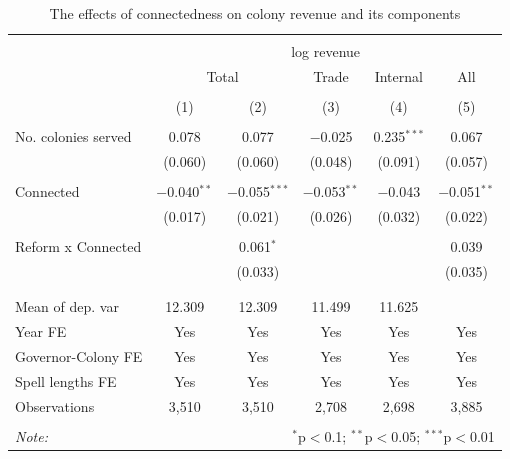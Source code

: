 \documentclass[a4paper]{article}\usepackage[]{graphicx}\usepackage[]{color}
\begin{document}
\begin{table}[!htbp] \centering 
  \caption{The effects of connectedness on colony revenue and its components} 
  \label{tab:rev} 
\scriptsize 
\begin{tabular}{@{\extracolsep{5pt}}lccccc} 
\\[-1.8ex]\hline 
\hline \\[-1.8ex] 
 & \multicolumn{5}{c}{log revenue} \\ 
\cline{2-6} 
 & \multicolumn{2}{c}{Total} & Trade & Internal & All \\ 
\\[-1.8ex] & (1) & (2) & (3) & (4) & (5)\\ 
\hline \\[-1.8ex] 
 No. colonies served & 0.078 & 0.077 & $-$0.025 & 0.235$^{***}$ & 0.067 \\ 
  & (0.060) & (0.060) & (0.048) & (0.091) & (0.057) \\ 
  & & & & & \\ 
 Connected & $-$0.040$^{**}$ & $-$0.055$^{***}$ & $-$0.053$^{**}$ & $-$0.043 & $-$0.051$^{**}$ \\ 
  & (0.017) & (0.021) & (0.026) & (0.032) & (0.022) \\ 
  & & & & & \\ 
 Reform x Connected &  & 0.061$^{*}$ &  &  & 0.039 \\ 
  &  & (0.033) &  &  & (0.035) \\ 
  & & & & & \\ 
\hline \\[-1.8ex] 
Mean of dep. var & 12.309 & 12.309 & 11.499 & 11.625 &  \\ 
Year FE & Yes & Yes & Yes & Yes & Yes \\ 
Governor-Colony FE & Yes & Yes & Yes & Yes & Yes \\ 
Spell lengths FE & Yes & Yes & Yes & Yes & Yes \\ 
Observations & 3,510 & 3,510 & 2,708 & 2,698 & 3,885 \\ 
\hline 
\hline \\[-1.8ex] 
\textit{Note:}  & \multicolumn{5}{r}{$^{*}$p$<$0.1; $^{**}$p$<$0.05; $^{***}$p$<$0.01} \\ 
\end{tabular} 
\end{table} 
\end{document}
